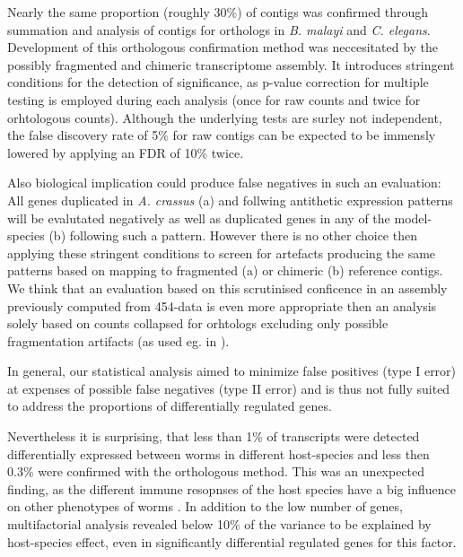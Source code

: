 Nearly the same proportion (roughly 30\%) of contigs was confirmed
through summation and analysis of contigs for orthologs in
\textit{B. malayi} and \textit{C. elegans}. Development of this
orthologous confirmation method was neccesitated by the possibly
fragmented and chimeric transcriptome assembly. It introduces
stringent conditions for the detection of significance, as p-value
correction for multiple testing is employed during each analysis (once
for raw counts and twice for orhtologous counts). Although the
underlying tests are surley not independent, the false discovery rate
of 5\% for raw contigs can be expected to be immensly lowered by
applying an FDR of 10\% twice.

Also biological implication could produce false negatives in such an
evaluation: All genes duplicated in \textit{A. crassus} (a) and
follwing antithetic expression patterns will be evalutated negatively
as well as duplicated genes in any of the model-species (b) following
such a pattern. However there is no other choice then applying these
stringent conditions to screen for artefacts producing the same
patterns based on mapping to fragmented (a) or chimeric (b) reference
contigs. We think that an evaluation based on this scrutinised
conficence in an assembly previously computed from 454-data is even
more appropriate then an analysis solely based on counts collapsed for
orhtologs excluding only possible fragmentation artifacts (as used
eg. in \cite{pmid22084086}).

In general, our statistical analysis aimed to minimize false positives
(type I error) at expenses of possible false negatives (type II error)
and is thus not fully suited to address the proportions of
differentially regulated genes.

Nevertheless it is surprising, that less than 1\% of transcripts were
detected differentially expressed between worms in different
host-species and less then 0.3\% were confirmed with the orthologous
method. This was an unexpected finding, as the different immune
resopnses of the host species have a big influence on other phenotypes
of worms \cite{knopf_swimbladder_2006}. In addition to the low number
of genes, multifactorial analysis revealed below 10\% of the variance
to be explained by host-species effect, even in significantly
differential regulated genes for this factor.

